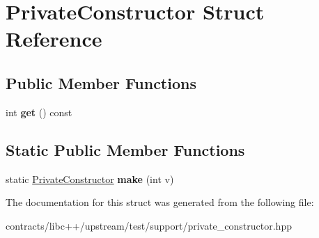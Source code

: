 \hypertarget{struct_private_constructor}{}\section{Private\+Constructor Struct Reference}
\label{struct_private_constructor}
\subsection*{Public Member Functions}
\begin{DoxyCompactItemize}
\item 
\mbox{\label{struct_private_constructor_aefbbb8d0d092a4d5c026d1a34abdcde7}} 
int {\bfseries get} () const
\end{DoxyCompactItemize}
\subsection*{Static Public Member Functions}
\begin{DoxyCompactItemize}
\item 
\mbox{\label{struct_private_constructor_ac0f44fe8f9bb1af5ece5474c6577bd87}} 
static \mbox{\hyperlink{struct_private_constructor}{Private\+Constructor}} {\bfseries make} (int v)
\end{DoxyCompactItemize}


The documentation for this struct was generated from the following file\+:\begin{DoxyCompactItemize}
\item 
contracts/libc++/upstream/test/support/private\+\_\+constructor.\+hpp\end{DoxyCompactItemize}
